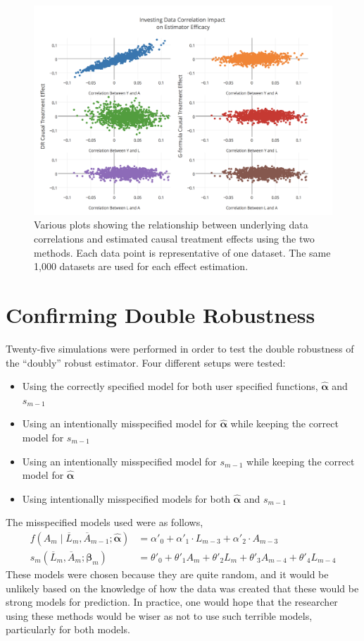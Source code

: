 \begin{figure}[h!]
\includegraphics[width = 1.1\linewidth]{figures/correlation.png}
\caption{Various plots showing the relationship between underlying data correlations and estimated causal treatment effects using the two methods.  Each data point is representative of one dataset.  The same 1,000 datasets are used for each effect estimation.}
\label{correlation}
\end{figure}

\newpage
\section{Confirming Double Robustness} 
Twenty-five simulations were performed in order to test the double robustness of the ``doubly'' robust estimator.  Four different setups were tested: 
\begin{itemize} 
\item Using the correctly specified model for both user specified functions, $\hat{\mathbf{\alpha}}$ and $s_{m-1}$ 
\item Using an intentionally misspecified model for $\hat{\mathbf{\alpha}}$ while keeping the correct model for $s_{m-1}$ 
\item Using an intentionally misspecified model for $s_{m-1}$ while keeping the correct model for $\hat{\mathbf{\alpha}}$
\item Using intentionally misspecified models for both $\hat{\mathbf{\alpha}}$ and $s_{m-1}$ 
\end{itemize} 

The misspecified models used were as follows, 
\begin{align} 
f(A_m \mid \overline{L}_m, \overline{A}_{m-1}; \hat{\mathbf{\alpha}}) &= \alpha'_{0} + \alpha'_{1} \cdot L_{m-3} + \alpha'_{2} \cdot A_{m-3} \\ 
s_{m}(\overline{L}_{m}, \overline{A}_{m};\mathbf{\beta}_{m}) &= \theta'_0 + \theta'_1 A_{m} +\theta'_2 L_m  +\theta'_3 A_{m-4} +  \theta'_4 L_{m-4} 
 \end{align} 
These models were chosen because they are quite random, and it would be unlikely based on the knowledge of how the data was created that these would be strong models for prediction.  In practice, one would hope that the researcher using these methods would be wiser as not to use such terrible models, particularly for both models.  

